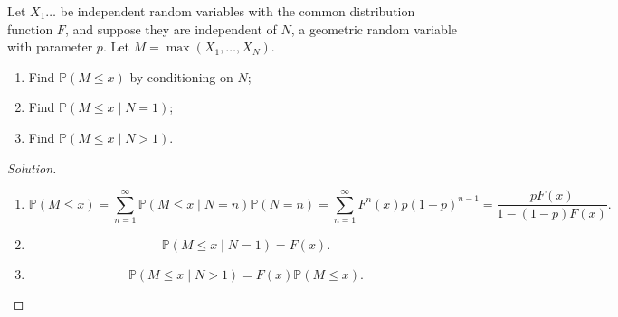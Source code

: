 \documentclass{article}[12pt]
\newenvironment{solution}
  {\renewcommand\qedsymbol{$\blacksquare$}\begin{proof}[Solution]}
  {\end{proof}}
\newenvironment{problem}[1]
  {\renewcommand\theinnercustomprblm{#1}\innercustomprblm}
  {\endinnercustomprblm}
\renewcommand{\P}{\mathbb{P}}
\begin{document}
\begin{problem}{7.61(a-c)}
Let $X_{1}\dots$ be independent random variables with the common distribution function $F$, and suppose they are independent of $N$, a geometric random variable with parameter $p$.
Let $M =\max(X_{1}, \dots, X_{N})$.
\begin{enumerate}[label=(\alph*)]
    \item Find $\P(M\leqslant x)$ by conditioning on $N$;
    \item Find $\P(M\leqslant x\mid N = 1)$;
    \item Find $\P(M\leqslant x\mid N > 1)$.
\end{enumerate}
\end{problem}
\begin{solution}
\text{}
\begin{enumerate}[label=(\alph*)]
    \item
    \begin{equation*}
        \P(M \leqslant x) = \sum_{n=1}^{\infty}\P(M \leqslant x\mid N = n)\P(N = n) = \sum_{n=1}^{\infty}F^{n}(x)p(1 - p)^{n-1} = \frac{pF(x)}{1 - (1 - p)F(x)}.
    \end{equation*}
    \item
    \begin{equation*}
        \P(M \leqslant x\mid N = 1) = F(x).
    \end{equation*}
    \item
    \begin{equation*}
        \P(M\leqslant x\mid N > 1) = F(x)\P(M \leqslant x).
    \end{equation*}
\end{enumerate}
\end{solution}
\end{document}
